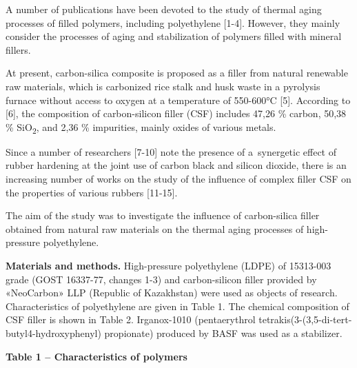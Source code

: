 A number of publications have been devoted to the study of thermal aging
processes of filled polymers, including polyethylene {[}1-4{]}. However,
they mainly consider the processes of aging and stabilization of
polymers filled with mineral fillers.

At present, carbon-silica composite is proposed as a filler from natural
renewable raw materials, which is carbonized rice stalk and husk waste
in a pyrolysis furnace without access to oxygen at a temperature of
550-600°C {[}5{]}. According to {[}6{]}, the composition of
carbon-silicon filler (CSF) includes 47,26 \% carbon, 50,38 \%
SiO\textsubscript{2}, and 2,36 \% impurities, mainly oxides of various
metals.

Since a number of researchers {[}7-10{]} note the presence of
a~synergetic effect of rubber hardening at the joint use of carbon black
and silicon dioxide, there is an increasing number of works on the study
of the influence of complex filler CSF on the properties of various
rubbers {[}11-15{]}.

The aim of the study was to investigate the influence of carbon-silica
filler obtained from natural raw materials on the thermal aging
processes of high-pressure polyethylene.

{\bfseries Materials and methods.} High-pressure polyethylene (LDPE) of
15313-003 grade (GOST 16337-77, changes 1-3) and carbon-silicon filler
provided by «NeoCarbon» LLP (Republic of Kazakhstan) were used as
objects of research. Characteristics of polyethylene are given in Table
1. The chemical composition of CSF filler is shown in Table 2.
Irganox-1010 (pentaerythrol
tetrakis(3-(3,5-di-tert-butyl4-hydroxyphenyl) propionate) produced by
BASF was used as a stabilizer.

{\bfseries Table 1 -- Characteristics of polymers}

